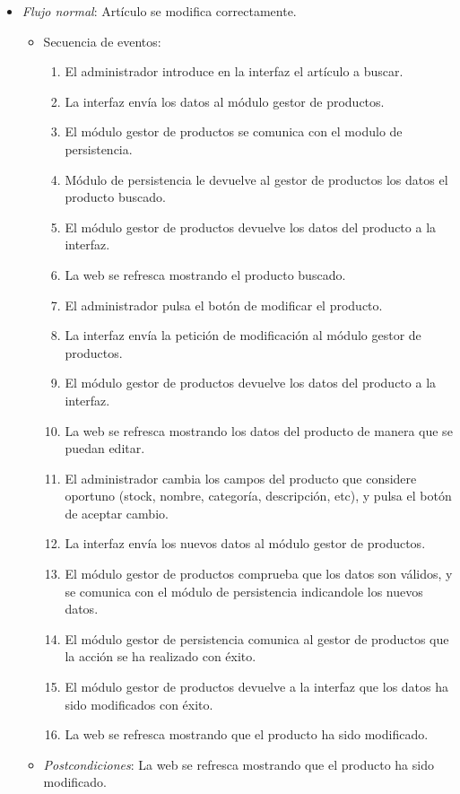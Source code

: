 \begin{enumerate}[{\bf UC-1}]
\begin{itemize}
  \item {\it Flujo normal}: Artículo se modifica correctamente.
\begin{itemize}
\item Secuencia de eventos:
    \begin{enumerate}[1. ]
    \item El administrador introduce en la interfaz el artículo a buscar.
    \item La interfaz envía los datos al módulo gestor de productos.
    \item El módulo gestor de productos se comunica con el modulo de persistencia.
    \item Módulo de persistencia le devuelve al gestor de productos los datos el producto buscado.
    \item El módulo gestor de productos devuelve los datos del producto a la interfaz.
    \item La web se refresca mostrando el producto buscado.
    \item El administrador pulsa el botón de modificar el producto.
    \item La interfaz envía la petición de modificación al módulo gestor de productos.
    \item El módulo gestor de productos devuelve los datos del producto a la interfaz.
    \item La web se refresca mostrando los datos  del producto de manera que se puedan editar.
    \item El administrador cambia los campos del producto que considere oportuno (stock, nombre, categoría, descripción, etc), y pulsa el botón de aceptar cambio.
    \item La interfaz envía los nuevos datos al módulo gestor de productos.
    \item El módulo gestor de productos comprueba que los datos son válidos, y se comunica con el módulo de persistencia indicandole los nuevos datos.
    \item El módulo gestor de persistencia comunica al gestor de productos que la acción se ha realizado con éxito.
    \item El módulo gestor de productos devuelve a la interfaz que los datos ha sido modificados con éxito.
    \item La web se refresca mostrando que el producto ha sido modificado.
    \end{enumerate}
  \item {\it Postcondiciones}: La web se refresca mostrando que el producto ha sido modificado.
\end{itemize}


\end{itemize}
\end{enumerate}
